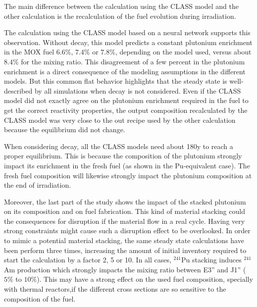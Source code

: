 \documentclass[12pt]{article}
\begin{document}
The main difference between the calculation using the CLASS model and the other
calculation is the recalculation of the fuel evolution during irradiation. 

The calculation using the CLASS model based on a neural network supports this
observation. Without decay, this model predicts a constant plutonium enrichment
in the MOX fuel $6.6\%$, $7.4\%$ or $7.8\%$, depending on the model used, versus
about $8.4\%$ for the mixing ratio. This disagreement of a few percent in the
plutonium enrichment is a direct consequence of the modeling assumptions in the different models.  But this common flat behavior highlights that the steady
state is well-described by all simulations when decay is not considered.
Even if the CLASS model did not exactly agree on the plutonium enrichment
required in the fuel to get the correct reactivity properties, the output composition recalculated by the CLASS
model was very close to the out recipe used by the other calculation because the
equilibrium did not change.

When considering decay, all the CLASS models need about 180y to reach a
proper equilibrium. This is because the composition of the plutonium
strongly impact its enrichment in the fresh fuel (as shown in the Pu-equivalent
case). The fresh fuel composition will likewise strongly impact the plutonium
composition at the end of irradiation. 

Moreover, the last part of the study shows the impact of the stacked plutonium
on its composition and on fuel fabrication. This kind of material
stacking could the consequences for disruption if the material flow in a real
cycle. Having very strong constraints might cause such a disruption effect to be overlooked. In order to mimic a potential material stacking, the same steady state
calculations have been perform three times, increasing the amount of initial
inventory required to start the calculation by a factor 2, 5 or 10. In all
cases, $^{241}$Pu stacking induces $^{241}$Am production which strongly impacts
the mixing ratio between E3'' and J1'' ( $5\%$ to $10\%$). This may have a
strong effect on the used fuel composition, specially with thermal reactors,if
the different cross sections are so sensitive to the composition of the fuel.








\end{document}
